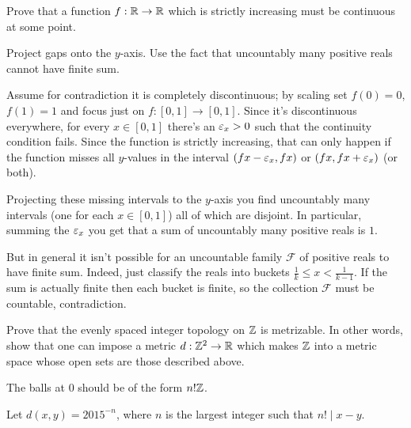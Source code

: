 \begin{problem}
	\gim
	Prove that a function $f : \mathbb R \to \mathbb R$ which is strictly increasing
	must be continuous at some point.
	\begin{hint}
		Project gaps onto the $y$-axis.
		Use the fact that uncountably many positive reals cannot have finite sum.
	\end{hint}
	\begin{sol}
		Assume for contradiction it is completely discontinuous;
		by scaling set $f(0) = 0$, $f(1) = 1$ and focus just on $f : [0,1] \to [0,1]$.
		Since it's discontinuous everywhere,
		for every $x \in [0,1]$ there's an $\varepsilon_x > 0$ such that the continuity condition fails.
		Since the function is strictly increasing, that can only happen if the
		function misses all $y$-values in the interval $(fx-\varepsilon_x, fx)$ or $(fx, fx+\varepsilon_x)$ (or both).

		Projecting these missing intervals to the $y$-axis you find uncountably
		many intervals (one for each $x \in [0,1]$) all of which are disjoint.
		In particular, summing the $\varepsilon_x$ you get that a sum of uncountably
		many positive reals is $1$.

		But in general it isn't possible for an uncountable family $\mathcal F$
		of positive reals to have finite sum.
		Indeed, just classify the reals into buckets $\frac1k \le x < \frac1{k-1}$.
		If the sum is actually finite then each bucket is finite,
		so the collection $\mathcal F$ must be countable, contradiction.
	\end{sol}
\end{problem}

\begin{problem}
	\gim
	Prove that the evenly spaced integer topology on $\mathbb Z$ is metrizable.
	In other words, show that one can impose a metric $d : \mathbb Z^2 \to \mathbb R$
	which makes $\mathbb Z$ into a metric space whose open sets are those described above.
	\begin{hint}
		The balls at $0$ should be of the form $n!\mathbb Z$.
	\end{hint}
	\begin{sol}
		Let $d(x,y) = 2015^{-n}$, where $n$ is the largest integer such that $n! \mid x-y$.
	\end{sol}
\end{problem}
